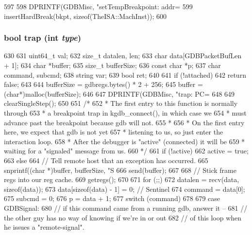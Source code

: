\begin{DoxyCode}
597 {
598     DPRINTF(GDBMisc, "setTempBreakpoint: addr=%
599     insertHardBreak(bkpt, sizeof(TheISA::MachInst));
600 }
\end{DoxyCode}
\hypertarget{classBaseRemoteGDB_a24d0c1ce5672f7476a707b0cef30386d}{
\subsubsection[{trap}]{\setlength{\rightskip}{0pt plus 5cm}bool trap (int {\em type})}}
\label{classBaseRemoteGDB_a24d0c1ce5672f7476a707b0cef30386d}



\begin{DoxyCode}
630 {
631     uint64_t val;
632     size_t datalen, len;
633     char data[GDBPacketBufLen + 1];
634     char *buffer;
635     size_t bufferSize;
636     const char *p;
637     char command, subcmd;
638     string var;
639     bool ret;
640 
641     if (!attached)
642         return false;
643 
644     bufferSize = gdbregs.bytes() * 2 + 256;
645     buffer = (char*)malloc(bufferSize);
646 
647     DPRINTF(GDBMisc, "trap: PC=%
648 
649     clearSingleStep();
650 
651     /*
652      * The first entry to this function is normally through
653      * a breakpoint trap in kgdb_connect(), in which case we
654      * must advance past the breakpoint because gdb will not.
655      *
656      * On the first entry here, we expect that gdb is not yet
657      * listening to us, so just enter the interaction loop.
658      * After the debugger is "active" (connected) it will be
659      * waiting for a "signaled" message from us.
660      */
661     if (!active)
662         active = true;
663     else
664         // Tell remote host that an exception has occurred.
665         snprintf((char *)buffer, bufferSize, "S%
666         send(buffer);
667 
668     // Stick frame regs into our reg cache.
669     getregs();
670 
671     for (;;) {
672         datalen = recv(data, sizeof(data));
673         data[sizeof(data) - 1] = 0; // Sentinel
674         command = data[0];
675         subcmd = 0;
676         p = data + 1;
677         switch (command) {
678 
679           case GDBSignal:
680             // if this command came from a running gdb, answer it --
681             // the other guy has no way of knowing if we're in or out
682             // of this loop when he issues a "remote-signal".
}}}
\end{DoxyCode}
